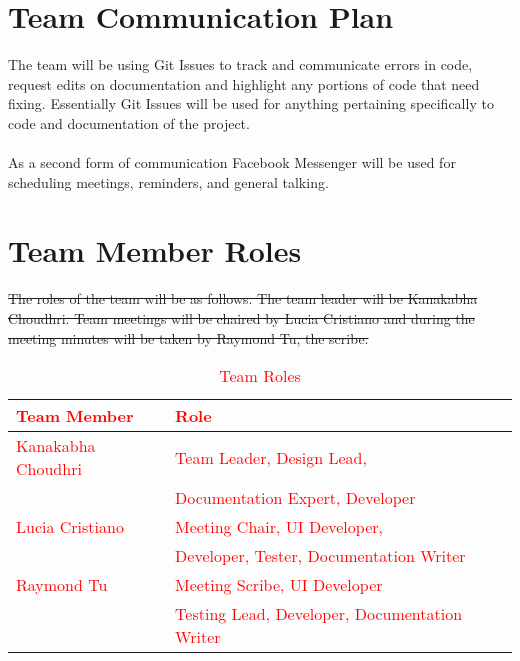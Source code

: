\documentclass{article}
\begin{document}
\section{Team Communication Plan}
The team will be using Git Issues to track and communicate errors in code, request edits on documentation and highlight any portions of code that need fixing. Essentially Git Issues will be used for anything pertaining specifically to code and documentation of the project.\\ \\
As a second form of communication Facebook Messenger will be used for scheduling meetings, reminders, and general talking. 

\section{Team Member Roles}
\sout{The roles of the team will be as follows. The team leader will be Kanakabha Choudhri. Team meetings will be chaired by Lucia Cristiano and during the meeting minutes will be taken by Raymond Tu, the scribe.}


\begin{table}[hp]
\textcolor{red}{\caption{\textcolor{red}{Team Roles}}} \label{TblRoles}
\begin{tabularx}{\textwidth}{llX}
\toprule
\textcolor{red}{Team Member} & \textcolor{red}{Role}\\
\midrule
\textcolor{red}{Kanakabha Choudhri} & \textcolor{red}{Team Leader, Design Lead,}\\
& \textcolor{red}{Documentation Expert, Developer}\\
\hline
\textcolor{red}{Lucia Cristiano} & \textcolor{red}{Meeting Chair, UI Developer,}\\
& \textcolor{red}{Developer, Tester, Documentation Writer}\\
\hline
\textcolor{red}{Raymond Tu} & \textcolor{red}{Meeting Scribe, UI Developer}\\ 
& \textcolor{red}{Testing Lead, Developer, Documentation Writer}\\
\bottomrule
\end{tabularx}
\end{table}
\end{document}
